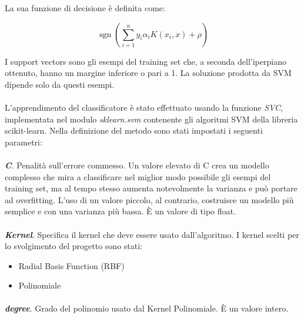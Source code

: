 \documentclass[12pt,a4paper,oneside,hidelinks]{report}
\DeclareMathOperator*{\sgn}{sgn}
\begin{document}
La sua funzione di decisione è definita come:

\begin{equation} \label{due}
\sgn(\sum_{i=1}^n y_i \alpha_i K(x_i, x) + \rho)
\end{equation}

I support vectors sono gli esempi del training set che, a seconda dell'iperpiano ottenuto, hanno un margine inferiore o pari a 1. La soluzione prodotta da SVM dipende solo da questi esempi.

\paragraph*{}
L'apprendimento del classificatore è stato effettuato usando la funzione \textit{SVC}, implementata nel modulo \textit{sklearn.svm} contenente gli algoritmi SVM della libreria scikit-learn. Nella definizione del metodo sono stati impostati i seguenti parametri:

\paragraph*{}
\textbf{\textit{C}}. Penalità sull'errore commesso. Un valore elevato di C crea un modello complesso che mira a classificare nel miglior modo possibile gli esempi del training set, ma al tempo stesso aumenta notevolmente la varianza e può portare ad overfitting. L'uso di un valore piccolo, al contrario, costruisce un modello più semplice e con una varianza più bassa. È un valore di tipo float. 

\paragraph*{}
\textbf{\textit{Kernel}}. Specifica il kernel che deve essere usato dall'algoritmo. I kernel scelti per lo svolgimento del progetto sono stati:

\begin{itemize}
    \item Radial Basis Function (RBF) 
    \item Polinomiale
\end{itemize}

\paragraph*{}
\textbf{\textit{degree}}. Grado del polinomio usato dal Kernel Polinomiale. È un valore intero.
\end{document}
